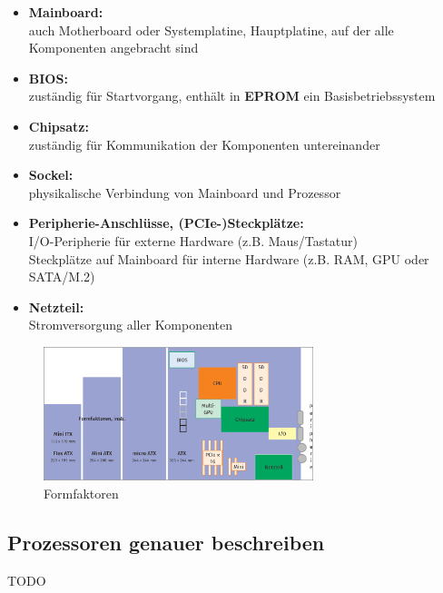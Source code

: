     \begin{subindent}
        \begin{itemize}[leftmargin=2.5cm, topsep=0.2em, itemsep=0.1em, parsep=0.3em]
            \item \textbf{Mainboard:} \\
                  auch Motherboard oder Systemplatine, Hauptplatine, auf der alle Komponenten angebracht sind
            \item \textbf{BIOS:} \\
                  zuständig für Startvorgang, enthält in \textbf{EPROM} ein Basisbetriebssystem
            \item \textbf{Chipsatz:} \\
                  zuständig für Kommunikation der Komponenten untereinander
            \item \textbf{Sockel:} \\
                  physikalische Verbindung von Mainboard und Prozessor
            \item \textbf{Peripherie-Anschlüsse, (PCIe-)Steckplätze:} \\
                  I/O-Peripherie für externe Hardware (z.B. Maus/Tastatur) \\
                  Steckplätze auf Mainboard für interne Hardware (z.B. RAM, GPU oder SATA/M.2)
            \item \textbf{Netzteil:} \\
                  Stromversorgung aller Komponenten
        \end{itemize}
    \end{subindent}
    
    \begin{figure}[ht]
        \centering
        \includegraphics[width=0.7\textwidth]{./images/2.4.2_formfaktoren.png}
        \caption{Formfaktoren}\label{fig:Formfaktoren}
    \end{figure}

\newpage
\subsection{Prozessoren genauer beschreiben}
    TODO

